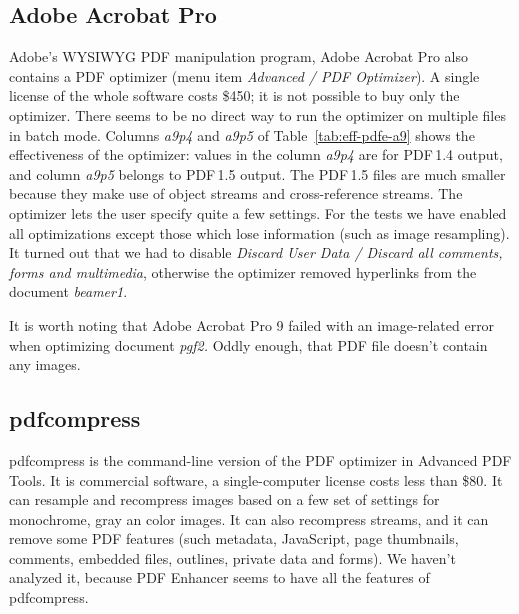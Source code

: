 \documentclass{ltugproc}
\def\cmd{\textsf}
\begin{document}
\subsection{Adobe Acrobat Pro}

Adobe's WYSIWYG PDF manipulation program, Adobe Acrobat Pro
\cite{acrobatpro} also contains a PDF optimizer (menu item \emph{Advanced /
PDF Optimizer}). A single license of the
whole software costs \$450; it is not possible to buy only the optimizer.
There seems to be no direct way to run the optimizer on multiple files in
batch mode. Columns \emph{a9p4} and \emph{a9p5} of
Table~\ref{tab:eff-pdfe-a9} shows the effectiveness of the optimizer: values
in the column \emph{a9p4} are for PDF\,1.4 output, and column \emph{a9p5}
belongs to PDF\,1.5 output. The PDF\,1.5 files are much smaller because they
make use of object streams and cross-reference streams. The optimizer lets
the user specify quite a few settings. For the tests we have enabled all
optimizations except those which lose information (such as image
resampling). It turned out that we had to disable \emph{Discard User Data /
Discard all comments, forms and multimedia}, otherwise the optimizer removed
hyperlinks from the document \emph{beamer1}.

It is worth noting that Adobe Acrobat Pro 9 failed with an image-related error
when optimizing document \emph{pgf2.} Oddly enough, that PDF file doesn't
contain any images.


\subsection{pdfcompress}

\cmd{pdfcompress} \cite{pdfcompress} is the command-line version of the PDF
optimizer in Advanced PDF Tools. It is commercial software, a
single-computer license costs less than \$80. It can resample and recompress
images based on a few set of settings for monochrome, gray an color images.
It can also recompress streams, and it can remove some PDF features (such
metadata, JavaScript, page thumbnails, comments, embedded files, outlines,
private data and forms). We haven't analyzed it, because PDF Enhancer
seems to have all the features of \cmd{pdfcompress}.
\end{document}
